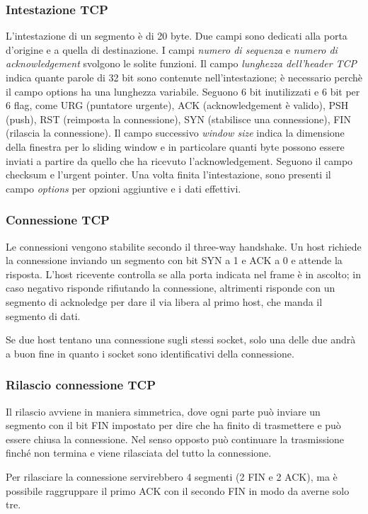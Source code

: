 \subsubsection{Intestazione TCP}
L'intestazione di un segmento è di 20 byte.
Due campi sono dedicati alla porta d'origine e a quella di destinazione.
I campi \textit{numero di sequenza} e \textit{numero di acknowledgement} svolgono le solite funzioni.
Il campo \textit{lunghezza dell'header TCP} indica quante parole di 32 bit sono contenute nell'intestazione; 
è necessario perchè il campo options ha una lunghezza variabile.
Seguono 6 bit inutilizzati e 6 bit per 6 flag, come URG (puntatore urgente), ACK (acknowledgement è valido), PSH (push), RST (reimposta la connessione), SYN (stabilisce una connessione), FIN (rilascia la connessione).
Il campo successivo \textit{window size} indica la dimensione della finestra per lo sliding window e in particolare quanti byte possono essere inviati a partire da quello che ha ricevuto l'acknowledgement.
Seguono il campo checksum e l'urgent pointer.
Una volta finita l'intestazione, sono presenti il campo \textit{options} per opzioni aggiuntive e i dati effettivi.

\subsubsection{Connessione TCP}
Le connessioni vengono stabilite secondo il three-way handshake.
Un host richiede la connessione inviando un segmento con bit SYN a 1 e ACK a 0 e attende la risposta.
L'host ricevente controlla se alla porta indicata nel frame è in ascolto; in caso negativo risponde rifiutando la connessione, 
altrimenti risponde con un segmento di acknoledge per dare il via libera al primo host, che manda il segmento di dati.

Se due host tentano una connessione sugli stessi socket, solo una delle due andrà a buon fine in quanto i socket sono identificativi della connessione.

\subsubsection{Rilascio connessione TCP}
Il rilascio avviene in maniera simmetrica, dove ogni parte può inviare un segmento con il bit FIN impostato per dire che ha finito di trasmettere e può essere chiusa la connessione.
Nel senso opposto può continuare la trasmissione finché non termina e viene rilasciata del tutto la connessione.

Per rilasciare la connessione servirebbero 4 segmenti (2 FIN e 2 ACK), ma è possibile raggruppare il primo ACK con il secondo FIN in modo da averne solo tre.

